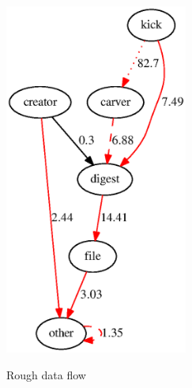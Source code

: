 \begin{figure}
{  \includegraphics[width=60mm]{ocfa/step5/stripped3_modtypes.eps}
}
\caption{Rough data flow}
\label{fig:RoughModules}
\end{figure}
